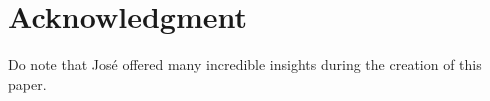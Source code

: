 \documentclass{amsart}
\begin{document}
\section*{Acknowledgment}
Do note that Jos\'e offered many incredible insights during the creation of this paper.
\end{document}
